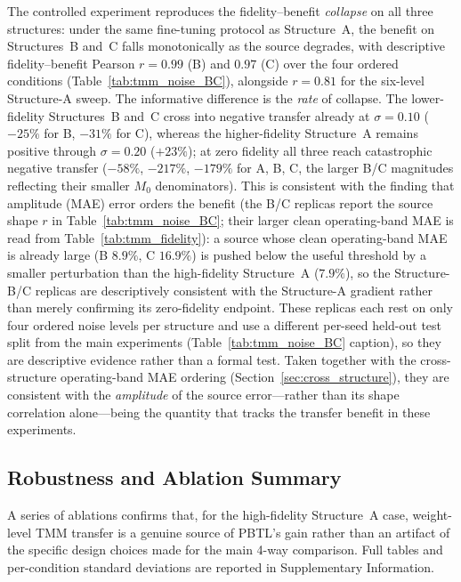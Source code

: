 \documentclass[a4paper,fleqn]{cas-sc}
\newcommand{\Mzero}{M_0}
\begin{document}
The controlled experiment reproduces the fidelity--benefit \emph{collapse} on all three structures: under the same fine-tuning protocol as Structure~A, the benefit on Structures~B and~C falls monotonically as the source degrades, with descriptive fidelity--benefit Pearson $r=0.99$ (B) and $0.97$ (C) over the four ordered conditions (Table~\ref{tab:tmm_noise_BC}), alongside $r=0.81$ for the six-level Structure-A sweep. The informative difference is the \emph{rate} of collapse. The lower-fidelity Structures~B and~C cross into negative transfer already at $\sigma=0.10$ ($-25\%$ for B, $-31\%$ for C), whereas the higher-fidelity Structure~A remains positive through $\sigma=0.20$ ($+23\%$); at zero fidelity all three reach catastrophic negative transfer ($-58\%$, $-217\%$, $-179\%$ for A, B, C, the larger B/C magnitudes reflecting their smaller $\Mzero$ denominators). This is consistent with the finding that amplitude (MAE) error orders the benefit (the B/C replicas report the source shape $r$ in Table~\ref{tab:tmm_noise_BC}; their larger clean operating-band MAE is read from Table~\ref{tab:tmm_fidelity}): a source whose clean operating-band MAE is already large (B $8.9\%$, C $16.9\%$) is pushed below the useful threshold by a smaller perturbation than the high-fidelity Structure~A ($7.9\%$), so the Structure-B/C replicas are descriptively consistent with the Structure-A gradient rather than merely confirming its zero-fidelity endpoint. These replicas each rest on only four ordered noise levels per structure and use a different per-seed held-out test split from the main experiments (Table~\ref{tab:tmm_noise_BC} caption), so they are descriptive evidence rather than a formal test. Taken together with the cross-structure operating-band MAE ordering (Section~\ref{sec:cross_structure}), they are consistent with the \emph{amplitude} of the source error---rather than its shape correlation alone---being the quantity that tracks the transfer benefit in these experiments.


\subsection{Robustness and Ablation Summary}
\label{sec:robustness_summary}

A series of ablations confirms that, for the high-fidelity Structure~A case, weight-level TMM transfer is a genuine source of PBTL's gain rather than an artifact of the specific design choices made for the main 4-way comparison. Full tables and per-condition standard deviations are reported in Supplementary Information.
\end{document}
